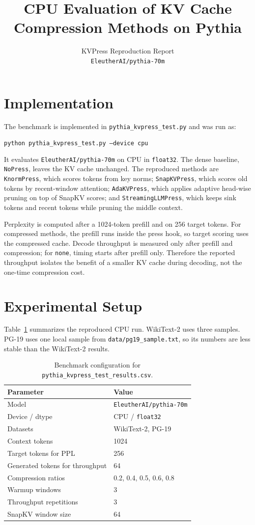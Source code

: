 \documentclass{article}
\title{CPU Evaluation of KV Cache Compression Methods on Pythia}
\author{%
  KVPress Reproduction Report\\
  \texttt{EleutherAI/pythia-70m}
}
\begin{document}
\maketitle

\section{Implementation}

The benchmark is implemented in \texttt{pythia\_kvpress\_test.py} and was run as:
\begin{center}
\small
\texttt{python pythia\_kvpress\_test.py ---device cpu}
\end{center}
It evaluates \texttt{EleutherAI/pythia-70m} on CPU in \texttt{float32}. The
dense baseline, \texttt{NoPress}, leaves the KV cache unchanged. The reproduced
methods are \texttt{KnormPress}, which scores tokens from key norms;
\texttt{SnapKVPress}, which scores old tokens by recent-window attention;
\texttt{AdaKVPress}, which applies adaptive head-wise pruning on top of SnapKV
scores; and \texttt{StreamingLLMPress}, which keeps sink tokens and recent
tokens while pruning the middle context.

Perplexity is computed after a 1024-token prefill and on 256 target tokens. For
compressed methods, the prefill runs inside the press hook, so target scoring
uses the compressed cache. Decode throughput is measured only after prefill and
compression; for \texttt{none}, timing starts after prefill only. Therefore the
reported throughput isolates the benefit of a smaller KV cache during decoding,
not the one-time compression cost.

\section{Experimental Setup}

Table~\ref{tab:setup} summarizes the reproduced CPU run. WikiText-2 uses three
samples. PG-19 uses one local sample from \texttt{data/pg19\_sample.txt}, so its
numbers are less stable than the WikiText-2 results.

\begin{table}[!b]
\centering
\caption{Benchmark configuration for \texttt{pythia\_kvpress\_test\_results.csv}.}
\label{tab:setup}
\begin{tabular}{l l}
\toprule
Parameter & Value \\
\midrule
Model & \texttt{EleutherAI/pythia-70m} \\
Device / dtype & CPU / \texttt{float32} \\
Datasets & WikiText-2, PG-19 \\
Context tokens & 1024 \\
Target tokens for PPL & 256 \\
Generated tokens for throughput & 64 \\
Compression ratios & 0.2, 0.4, 0.5, 0.6, 0.8 \\
Warmup windows & 3 \\
Throughput repetitions & 3 \\
SnapKV window size & 64 \\
\bottomrule
\end{tabular}
\end{table}
\end{document}
